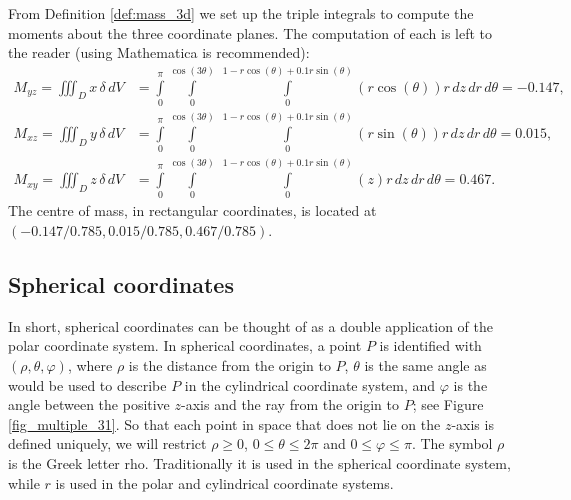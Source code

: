\begin{example}
From Definition \ref{def:mass_3d} we set up the triple integrals to compute the moments about the three coordinate planes. The computation of each is left to the reader (using Mathematica is recommended):
\begin{align*}
M_{yz} = \iiint_D x\,\delta\,dV &= \int\limits_0^{\pi}\int\limits_0^{\cos(3\theta)}\ \int\limits_0^{1-r\cos(\theta)+0.1r\sin(\theta)} (r\cos(\theta)) r\,dz\,dr\,d\theta = -0.147, \\[0.2cm]
M_{xz} = \iiint_D y\,\delta\,dV &= \int\limits_0^{\pi}\int\limits_0^{\cos(3\theta)}\ \int\limits_0^{1-r\cos(\theta)+0.1r\sin(\theta)} (r\sin(\theta)) r\,dz\,dr\,d\theta = 0.015,\\[0.2cm]
M_{xy} = \iiint_D z\,\delta\,dV &= \int\limits_0^{\pi}\int\limits_0^{\cos(3\theta)}\ \int\limits_0^{1-r\cos(\theta)+0.1r\sin(\theta)} (z) r\,dz\,dr\,d\theta = 0.467.
\end{align*}
The centre of mass, in rectangular coordinates,  is located at $(-0.147/0.785,0.015/0.785,0.467/0.785)$.
\end{example}

\subsection{Spherical coordinates}

	\checkoddpage
{}

In short, spherical coordinates can be thought of as a double application of the polar coordinate system. In spherical coordinates, a point $P$ is identified with $(\rho,\theta,\varphi)$, where $\rho$ is the distance from the origin to $P$, $\theta$ is the same angle as would be used to describe $P$ in the cylindrical coordinate system, and $\varphi$ is the angle between the positive $z$-axis and the ray from the origin to $P$; see Figure \ref{fig_multiple_31}. So that each point in space that does not lie on the $z$-axis is defined uniquely, we will restrict $\rho \geq 0$, $0 \leq \theta \leq 2\pi$ and $0 \leq \varphi \leq \pi$.
The symbol $\rho$ is the Greek letter rho. Traditionally it is used in the spherical coordinate system, while $r$ is used in the polar and cylindrical coordinate systems.







